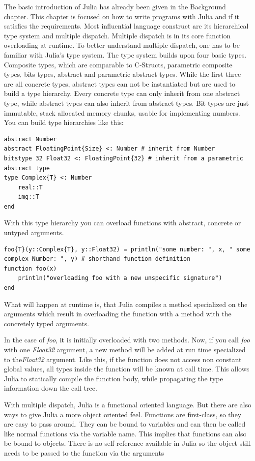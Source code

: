 The basic introduction of Julia has already been given in the Background chapter.
This chapter is focused on how to write programs with Julia and if it satisfies the requirements.
Most influential language construct are its hierarchical type system and multiple dispatch.
Multiple dispatch is in its core function overloading at runtime. 
To better understand multiple dispatch, one has to be familiar with Julia's type system.
The type system builds upon four basic types. 
Composite types, which are comparable to C-Structs, parametric composite types, bits types, abstract and parametric abstract types.
While the first three are all concrete types, abstract types can not be instantiated but are used to build a type hierarchy.
Every concrete type can only inherit from one abstract type, while abstract types can also inherit from abstract types.
Bit types are just immutable, stack allocated memory chunks, usable for implementing numbers.
You can build type hierarchies like this:
\begin{lstlisting}
abstract Number
abstract FloatingPoint{Size} <: Number # inherit from Number
bitstype 32 Float32 <: FloatingPoint{32} # inherit from a parametric abstract type
type Complex{T} <: Number
    real::T
    img::T
end
\end{lstlisting}

With this type hierarchy you can overload functions with abstract, concrete or untyped arguments.

\begin{lstlisting}
foo{T}(y::Complex{T}, y::Float32) = println("some number: ", x, " some complex Number: ", y) # shorthand function definition
function foo(x)
    println("overloading foo with a new unspecific signature")
end
\end{lstlisting}

What will happen at runtime is, that Julia compiles a method specialized on the arguments which result in overloading the function with a method with the concretely typed arguments.

In the case of \textit{foo}, it is initially overloaded with two methods.
Now, if you call \textit{foo} with one \textit{Float32} argument, a new method will be added at run time specialized to the\textit{Float32} argument.
Like this, if the function does not access non constant global values, all types inside the function will be known at call time.
This allows Julia to statically compile the function body, while propagating the type information down the call tree.

With multiple dispatch, Julia is a functional oriented language. But there are also ways to give Julia a more object oriented feel.
Functions are first-class, so they are easy to pass around. 
They can be bound to variables and can then be called like normal functions via the variable name. This implies that functions can also be bound to objects.
There is no self-reference available in Julia so the object still needs to be passed to the function via the arguments

